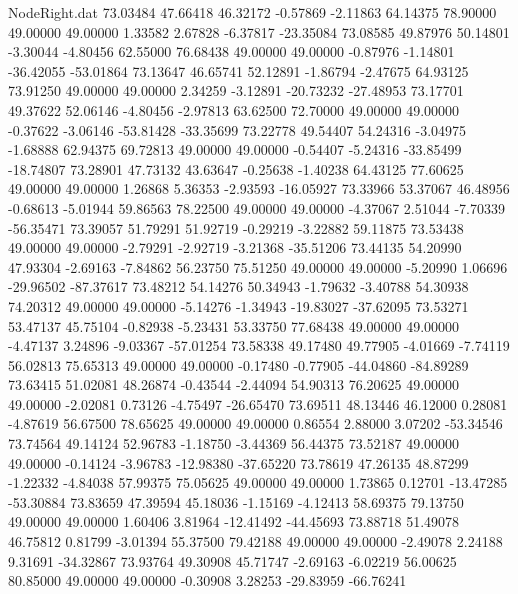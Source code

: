 \begin{filecontents}{NodeRight.dat}
  73.03484   47.66418   46.32172    -0.57869   -2.11863   64.14375   78.90000   49.00000   49.00000    1.33582    2.67828   -6.37817  -23.35084
  73.08585   49.87976   50.14801    -3.30044   -4.80456   62.55000   76.68438   49.00000   49.00000   -0.87976   -1.14801  -36.42055  -53.01864
  73.13647   46.65741   52.12891    -1.86794   -2.47675   64.93125   73.91250   49.00000   49.00000    2.34259   -3.12891  -20.73232  -27.48953
  73.17701   49.37622   52.06146    -4.80456   -2.97813   63.62500   72.70000   49.00000   49.00000   -0.37622   -3.06146  -53.81428  -33.35699
  73.22778   49.54407   54.24316    -3.04975   -1.68888   62.94375   69.72813   49.00000   49.00000   -0.54407   -5.24316  -33.85499  -18.74807
  73.28901   47.73132   43.63647    -0.25638   -1.40238   64.43125   77.60625   49.00000   49.00000    1.26868    5.36353   -2.93593  -16.05927
  73.33966   53.37067   46.48956    -0.68613   -5.01944   59.86563   78.22500   49.00000   49.00000   -4.37067    2.51044   -7.70339  -56.35471
  73.39057   51.79291   51.92719    -0.29219   -3.22882   59.11875   73.53438   49.00000   49.00000   -2.79291   -2.92719   -3.21368  -35.51206
  73.44135   54.20990   47.93304    -2.69163   -7.84862   56.23750   75.51250   49.00000   49.00000   -5.20990    1.06696  -29.96502  -87.37617
  73.48212   54.14276   50.34943    -1.79632   -3.40788   54.30938   74.20312   49.00000   49.00000   -5.14276   -1.34943  -19.83027  -37.62095
  73.53271   53.47137   45.75104    -0.82938   -5.23431   53.33750   77.68438   49.00000   49.00000   -4.47137    3.24896   -9.03367  -57.01254
  73.58338   49.17480   49.77905    -4.01669   -7.74119   56.02813   75.65313   49.00000   49.00000   -0.17480   -0.77905  -44.04860  -84.89289
  73.63415   51.02081   48.26874    -0.43544   -2.44094   54.90313   76.20625   49.00000   49.00000   -2.02081    0.73126   -4.75497  -26.65470
  73.69511   48.13446   46.12000     0.28081   -4.87619   56.67500   78.65625   49.00000   49.00000    0.86554    2.88000    3.07202  -53.34546
  73.74564   49.14124   52.96783    -1.18750   -3.44369   56.44375   73.52187   49.00000   49.00000   -0.14124   -3.96783  -12.98380  -37.65220
  73.78619   47.26135   48.87299    -1.22332   -4.84038   57.99375   75.05625   49.00000   49.00000    1.73865    0.12701  -13.47285  -53.30884
  73.83659   47.39594   45.18036    -1.15169   -4.12413   58.69375   79.13750   49.00000   49.00000    1.60406    3.81964  -12.41492  -44.45693
  73.88718   51.49078   46.75812     0.81799   -3.01394   55.37500   79.42188   49.00000   49.00000   -2.49078    2.24188    9.31691  -34.32867
  73.93764   49.30908   45.71747    -2.69163   -6.02219   56.00625   80.85000   49.00000   49.00000   -0.30908    3.28253  -29.83959  -66.76241

\end{filecontents}
